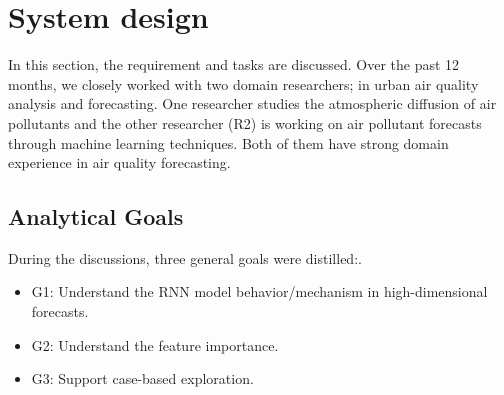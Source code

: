 \section{System design}
In this section, the requirement and tasks are discussed. Over the past 12 months, we closely worked with two domain researchers; in urban air quality analysis and forecasting. One researcher  studies the atmospheric diffusion of air pollutants and the other researcher (R2) is working on air pollutant forecasts through machine learning techniques. Both of them have strong domain experience in air quality forecasting. 

\subsection{Analytical  Goals}

During the discussions, three general goals were distilled:. 

\begin{itemize}
  \item G1: Understand the RNN model behavior/mechanism in high-dimensional forecasts. 
  \item G2: Understand the feature importance. 
  \item G3: Support case-based exploration.
\end{itemize}


